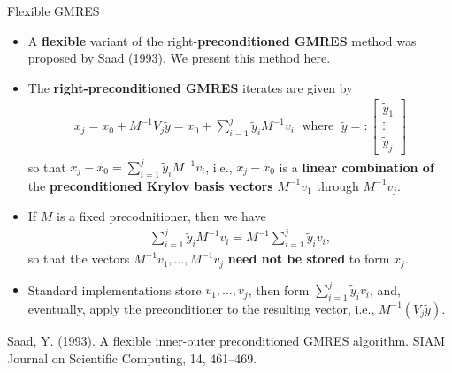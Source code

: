 \documentclass[t,usepdftitle=false]{beamer}
\begin{document}
\begin{frame}{Flexible GMRES}
\begin{itemize}
\item A \textbf{flexible} variant of the right-\textbf{preconditioned GMRES} method was proposed by Saad (1993).
We present this method here.
\item The \textbf{right-preconditioned GMRES} iterates are given by\vspace{-.15cm}
\begin{align*}
x_j
=x_0+M^{-1}V_j\tilde{y}
=x_0+\sum_{i=1}^j\tilde{y}_iM^{-1}v_i
\;\text{ where }\;
\tilde{y}=:\begin{bmatrix}\tilde{y}_1\\\vdots\\\tilde{y}_j\end{bmatrix}
\end{align*}
so that $x_j-x_0=\sum_{i=1}^j\tilde{y}_iM^{-1}v_i$, i.e., $x_j-x_0$ is a \textbf{linear combination of} the \textbf{preconditioned Krylov basis vectors} $M^{-1}v_1$ through $M^{-1}v_j$.
\item[] If $M$ is a fixed precodnitioner, then we have\vspace{-.15cm}
\begin{align*}
\sum_{i=1}^j\tilde{y}_iM^{-1}v_i=M^{-1}\sum_{i=1}^j\tilde{y}_iv_i,
\end{align*}
so that the vectors $M^{-1}v_1, \dots,M^{-1}v_j$ \textbf{need not be stored} to form $x_j$.
\item[] Standard implementations store $v_1,\dots,v_j$, then form $\sum_{i=1}^j\tilde{y}_iv_i$, and, eventually, apply the preconditioner to the resulting vector, i.e., $M^{-1}(V_j\tilde{y})$.
\end{itemize}\smallskip
\tiny{Saad, Y. (1993). A flexible inner-outer preconditioned GMRES algorithm. SIAM Journal on Scientific Computing, 14, 461–469.}
\end{frame}
\end{document}
